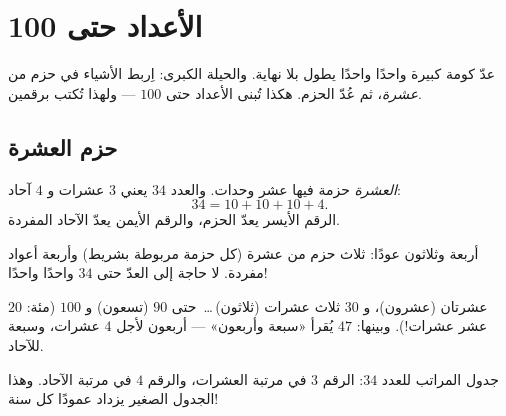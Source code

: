 \chapter{الأعداد حتى 100}\label{ch:g1:tens}

عدّ كومة كبيرة واحدًا واحدًا يطول بلا نهاية. والحيلة الكبرى: اِربط
الأشياء في حزم من \emph{عشرة}، ثم عُدّ الحزم. هكذا تُبنى الأعداد
حتى $100$ --- ولهذا تُكتب
برقمين.

\section{حزم العشرة}

\begin{definition}\label{def:g1:tens:def}
\emph{العشرة} حزمة فيها عشر وحدات. والعدد $34$ يعني $3$
عشرات و $4$ آحاد:
\[
34 = 10 + 10 + 10 + 4 .
\]
الرقم الأيسر يعدّ الحزم، والرقم الأيمن يعدّ الآحاد المفردة.
\end{definition}

\begin{omfigure}

{\small أربعة وثلاثون عودًا: ثلاث حزم من عشرة (كل حزمة مربوطة
بشريط) وأربعة أعواد مفردة. لا حاجة إلى العدّ حتى $34$ واحدًا واحدًا!}
\end{omfigure}

\begin{example}\label{ex:g1:tens:reading}
$20$ عشرتان (عشرون)، و $30$ ثلاث عشرات (ثلاثون)\,\dots\ حتى
$90$ (تسعون) و $100$ (مئة: عشر عشرات!). وبينها:
$47$ يُقرأ «سبعة وأربعون» --- أربعون لأجل $4$ عشرات، وسبعة
للآحاد.
\end{example}

\begin{omfigure}

{\small جدول المراتب للعدد $34$: الرقم $3$ في مرتبة العشرات،
والرقم $4$ في مرتبة الآحاد. وهذا الجدول الصغير يزداد عمودًا كل
سنة!}
\end{omfigure}

